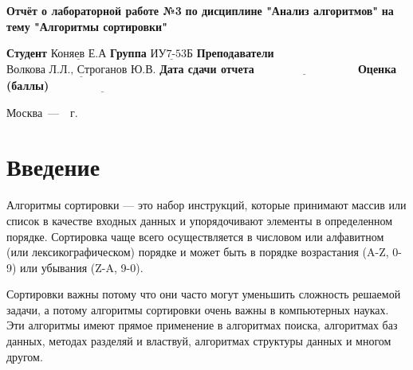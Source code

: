 \documentclass[12pt]{report}
\begin{document}
\begin{titlepage}
		
		\begin{center}
			\noindent\begin{minipage}{1.3\textwidth}\centering
				\Large\textbf{  Отчёт о лабораторной работе №3}\newline
				\textbf{по дисциплине "Анализ алгоритмов"}\newline
				\textbf{на тему "Алгоритмы сортировки"}\newline\newline
			\end{minipage}
		\end{center}
		
		\noindent\textbf{Студент} $\underline{\text{Коняев Е.А}}$\newline\newline
		\noindent\textbf{Группа} $\underline{\text{ИУ7-53Б}}$\newline\newline
		\noindent\textbf{Преподаватели} $\underline{\text{Волкова Л.Л., Строганов Ю.В.}}$\newline\newline
		\noindent\textbf{Дата сдачи отчета}$\underline{\text{~~~~~~~~~~~~~~~~~~~~~~~~~~~}}$\newline\newline
		\noindent\textbf{Оценка (баллы)} $\underline{\text{~~~~~~~~~~~~~~~~~~~~~~~~~~~}}$\newline\newline\newline
		
		\begin{center}
			\vfill
			Москва~---~\the\year~г.
		\end{center}
	\end{titlepage}
	
	\setcounter{page}{2}
	\tableofcontents
	
	\newpage
	\chapter*{Введение}
	
	\addcontentsline{toc}{chapter}{Введение}
	
	
Алгоритмы сортировки — это набор инструкций, которые принимают массив или список в качестве входных данных и упорядочивают элементы в определенном порядке. Сортировка чаще всего осуществляется в числовом или алфавитном (или лексикографическом) порядке и может быть в порядке возрастания (A-Z, 0-9) или убывания (Z-A, 9-0).

Сортировки важны потому что они часто могут уменьшить сложность решаемой задачи, а потому алгоритмы сортировки очень важны в компьютерных науках. Эти алгоритмы имеют прямое применение в алгоритмах поиска, алгоритмах баз данных, методах разделяй и властвуй, алгоритмах структуры данных и многом другом.\newline
\end{document}
